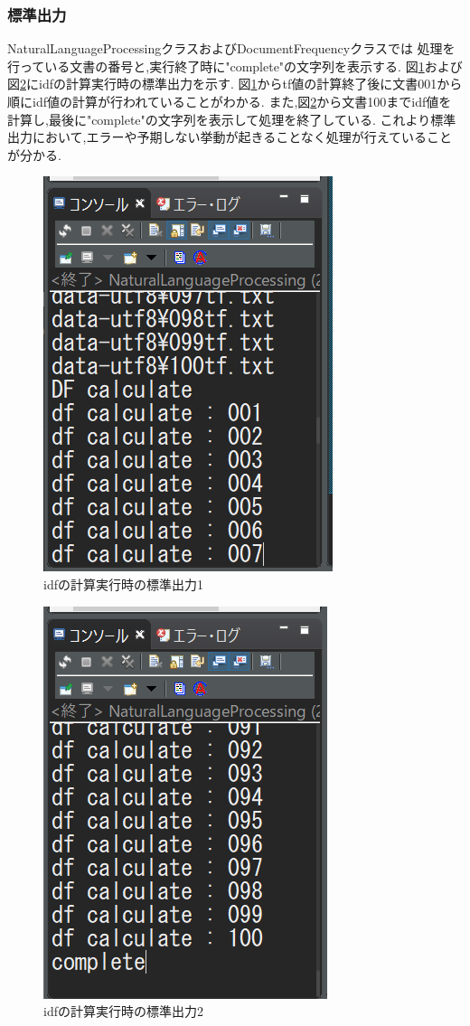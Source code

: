 \documentclass[a4j]{jarticle}
\begin{document}
\subsubsection{標準出力}
NaturalLanguageProcessingクラスおよびDocumentFrequencyクラスでは
処理を行っている文書の番号と,実行終了時に"complete"の文字列を表示する.
図\ref{startidf}および図\ref{endidf}にidfの計算実行時の標準出力を示す.
図\ref{startidf}からtf値の計算終了後に文書001から順にidf値の計算が行われていることがわかる.
また,図\ref{endidf}から文書100までidf値を計算し,最後に"complete"の文字列を表示して処理を終了している.
これより標準出力において,エラーや予期しない挙動が起きることなく処理が行えていることが分かる.
\begin{figure}[H]
	\centering
	\includegraphics[scale=0.65]{idfstart.png}
	\caption{idfの計算実行時の標準出力1}
   \label{startidf}
  \end{figure}

\begin{figure}[H]
	\centering
	\includegraphics[scale=0.65]{idfend.png}
	\caption{idfの計算実行時の標準出力2}
   \label{endidf}
  \end{figure}
\end{document}

